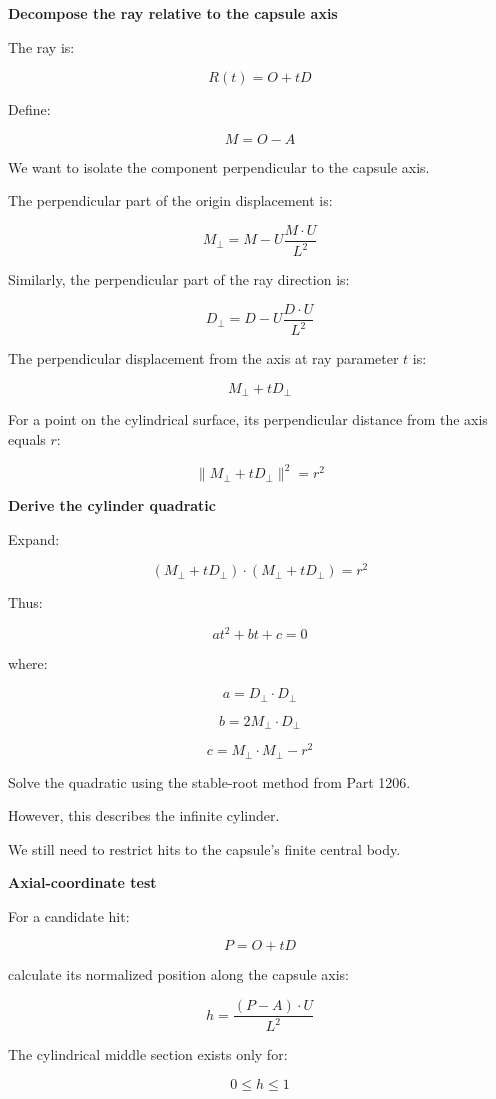 \textbf{Decompose the ray relative to the capsule axis}

The ray is:

\[
R(t)=O+tD
\]

Define:

\[
M=O-A
\]

We want to isolate the component perpendicular to the capsule axis.

The perpendicular part of the origin displacement is:

\[
\boxed{ M_\perp= M-U\frac{M\cdot U}{L^2} }
\]

Similarly, the perpendicular part of the ray direction is:

\[
\boxed{ D_\perp= D-U\frac{D\cdot U}{L^2} }
\]

The perpendicular displacement from the axis at ray parameter \(t\) is:

\[
M_\perp+tD_\perp
\]

For a point on the cylindrical surface, its perpendicular distance from the axis equals \(r\):

\[
\|M_\perp+tD_\perp\|^2=r^2
\]

\textbf{Derive the cylinder quadratic}

Expand:

\[
(M_\perp+tD_\perp)\cdot (M_\perp+tD_\perp)=r^2
\]

Thus:

\[
\boxed{ at^2+bt+c=0 }
\]

where:

\[
\boxed{ a=D_\perp\cdot D_\perp }
\]

\[
\boxed{ b=2M_\perp\cdot D_\perp }
\]

\[
\boxed{ c=M_\perp\cdot M_\perp-r^2 }
\]

Solve the quadratic using the stable-root method from Part 1206.

However, this describes the infinite cylinder.

We still need to restrict hits to the capsule's finite central body.

\textbf{Axial-coordinate test}

For a candidate hit:

\[
P=O+tD
\]

calculate its normalized position along the capsule axis:

\[
\boxed{ h=\frac{(P-A)\cdot U}{L^2} }
\]

The cylindrical middle section exists only for:

\[
\boxed{ 0\le h\le1 }
\]

